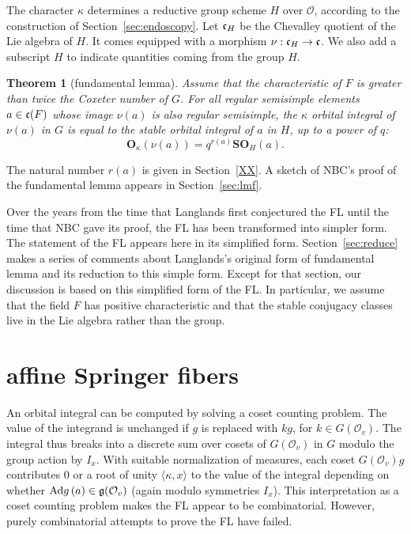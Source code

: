 \documentclass[brochure,english,12pt]{bourbaki}
\newtheorem{theorem}[equation]{Theorem}
\def\op#1{{\operatorname{#1}}}
\def\SO{{\mathbf {SO}}}
\def\OO{{\mathbf O}}
\def\g{\frak{g}}
\def\cc{\frak{c}}
\def\O{{\mathcal O}}
\begin{document}
The character $\kappa$ determines a reductive group scheme $H$ over $\O$,
according to the construction of Section~\ref{sec:endoscopy}.
  Let $\cc_H$ be the
Chevalley quotient of the Lie algebra of $H$.  It comes equipped with a morphism $\nu:\cc_H\to\cc$.
We also add a subscript $H$ to indicate
quantities coming from the group $H$.


\begin{theorem}[fundamental lemma]
Assume that the characteristic of $F$ is greater than twice the Coxeter number of $G$.
For all regular semisimple elements $a\in \cc(F)$ whose image
$\nu(a)$ is also regular semisimple, the $\kappa$ orbital integral of $\nu(a)$ in $G$ is
equal to the stable orbital integral of $a$ in $H$, up to a power of $q$:
\[
\OO_\kappa(\nu(a)) = q^{r(a)}\SO_H(a).
\]
\end{theorem}
The  natural number $r(a)$ is given in Section~\ref{XX}.  A sketch of NBC's proof of the fundamental
lemma appears in Section~\ref{sec:lmf}. 


Over the years from the time that Langlands first conjectured the
FL until the time that NBC gave its proof, the FL has
been transformed into simpler form.   The statement of the FL appears here in its simplified form.
Section~\ref{sec:reduce} makes a series of comments about Langlands's original form of fundamental
lemma and its reduction to this simple form.  Except for that section, our discussion is
based on this simplified form of the FL.  In particular, we assume that
the field $F$ has positive characteristic and that the stable conjugacy classes live in the
Lie algebra rather than the group.


\section{affine Springer fibers}

An orbital integral
can be computed by solving a coset counting problem. 
The value of the integrand is unchanged if
$g$ is replaced with $k g$, for $k\in G(\O_v)$.  The integral thus
breaks into a discrete sum over cosets of $G(\O_v)$ in $G$ modulo the
group action by $I_x$.  With suitable normalization of measures, each
coset $G(\O_v)g$ contributes $0$ or a root of unity $\langle\kappa,x\rangle$ to
the value of the integral depending on whether $\op{Ad}g\,(a) \in
\g(\O_v)$ (again modulo symmetries $I_x$).   This interpretation 
as a coset counting problem makes the FL appear to be
combinatorial.  However, purely combinatorial attempts to prove the FL have  failed.
\end{document}

